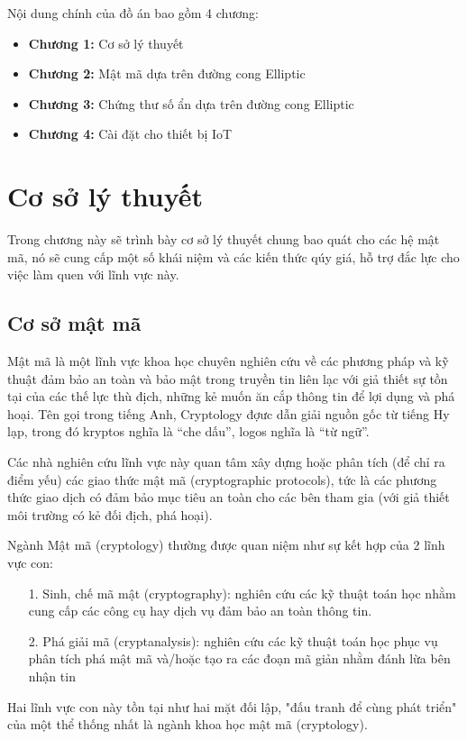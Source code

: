 \documentclass[a4paper,12pt]{report}
\begin{document}
Nội dung chính của đồ án bao gồm 4 chương:
\begin{itemize}
\item \textbf{Chương 1:} Cơ sở lý thuyết
\item \textbf{Chương 2:} Mật mã dựa trên đường cong Elliptic
\item \textbf{Chương 3:} Chứng thư số ẩn dựa trên đường cong Elliptic
\item \textbf{Chương 4:} Cài đặt cho thiết bị IoT
\end{itemize}
\chapter{Cơ sở lý thuyết}
Trong chương này sẽ trình bày cơ sở lý thuyết chung bao quát cho các hệ mật mã, nó sẽ cung cấp một số khái niệm và các kiến thức qúy giá, hỗ trợ đắc lực cho việc làm quen với lĩnh vực này.
\section{Cơ sở mật mã}
Mật mã là một lĩnh vực khoa học chuyên nghiên cứu về các phương pháp và kỹ thuật đảm bảo an toàn và bảo mật trong truyền tin liên lạc với giả thiết sự tồn tại của
các thế lực thù địch, những kẻ muốn ăn cắp thông tin để lợi dụng và phá hoại. Tên gọi trong tiếng Anh, Cryptology đợưc dẫn giải nguồn gốc từ tiếng Hy lạp, trong đó kryptos nghĩa là “che dấu”, logos nghĩa là “từ ngữ”.

Các nhà nghiên cứu lĩnh vực này quan tâm xây dựng hoặc phân tích (để chỉ ra điểm yếu) các giao thức mật mã (cryptographic protocols), tức là các phương thức giao dịch có đảm bảo mục tiêu an toàn cho các bên tham gia (với giả thiết môi trường có kẻ đối địch, phá hoại). 

Ngành Mật mã (cryptology) thường được quan niệm như sự kết hợp của 2 lĩnh vực con:
\begin{itemize}
\item[1. ] Sinh, chế mã mật (cryptography): nghiên cứu các kỹ thuật toán học nhằm cung cấp các công cụ hay dịch vụ đảm bảo an toàn thông tin.
\item[2. ] Phá giải mã (cryptanalysis): nghiên cứu các kỹ thuật toán học phục vụ phân tích phá mật mã và/hoặc tạo ra các đoạn mã giản nhằm đánh lừa bên nhận tin
\end{itemize}

Hai lĩnh vực con này tồn tại như hai mặt đối lập, "đấu tranh để cùng phát triển" của một thể thống nhất là ngành khoa học mật mã (cryptology).
\end{document}
